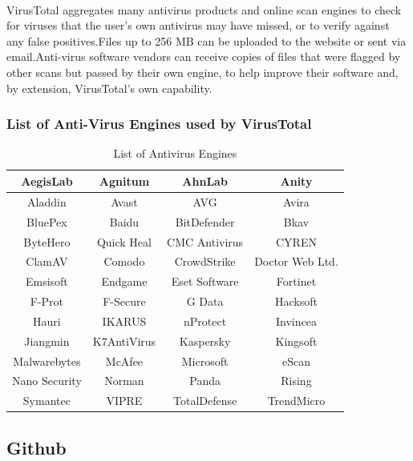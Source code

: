 \documentclass{report}
\begin{document}
\paragraph{}
VirusTotal aggregates many antivirus products and online scan engines to check for viruses that the user's own antivirus may have missed, or to verify against any false positives.Files up to 256 MB can be uploaded to the website or sent via email.Anti-virus software vendors can receive copies of files that were flagged by other scans but passed by their own engine, to help improve their software and, by extension, VirusTotal's own capability. 

\subsubsection{List of Anti-Virus Engines used by VirusTotal}


\begin{table}[h!]
\begin{center}

\begin{tabular}{ |c|c|c|c| } 
 \hline
 AegisLab & Agnitum & AhnLab & Anity\\
 \hline
 Aladdin & Avast & AVG  & Avira \\
 \hline
 BluePex  & Baidu  & BitDefender & Bkav  \\
 \hline
 ByteHero & Quick Heal & CMC Antivirus & CYREN \\
 \hline
 ClamAV  & Comodo & CrowdStrike & Doctor Web Ltd. \\
 \hline
 Emsisoft & Endgame & Eset Software & Fortinet \\
 \hline
 F-Prot  & F-Secure & G Data & Hacksoft \\
 \hline
 Hauri  & IKARUS & nProtect & Invincea  \\
 \hline
 Jiangmin & K7AntiVirus & Kaspersky & Kingsoft\\
 \hline
 Malwarebytes  & McAfee & Microsoft & eScan \\
 \hline
 Nano Security  & Norman & Panda & Rising \\
 \hline
  Symantec  & VIPRE & TotalDefense & TrendMicro \\
 \hline
 
 
 \hline
\end{tabular}
\caption{List of Antivirus Engines}
\end{center}
\end{table}

\subsection{Github}
\end{document}
